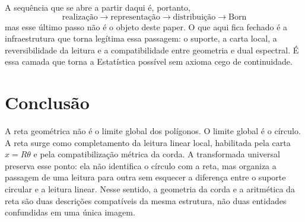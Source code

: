 \documentclass[11pt,a4paper]{article}
\begin{document}
A sequência que se abre a partir daqui é, portanto,
\[
\boxed{
\text{realização}
\longrightarrow
\text{representação}
\longrightarrow
\text{distribuição}
\longrightarrow
\text{Born}
}
\]
mas esse último passo não é o objeto deste paper. O que aqui fica fechado é a infraestrutura que torna legítima essa passagem: o suporte, a carta local, a reversibilidade da leitura e a compatibilidade entre geometria e dual espectral. É essa camada que torna a Estatística possível sem axioma cego de continuidade.

\section{Conclusão}

A reta geométrica não é o limite global dos polígonos. O limite global é o círculo. A reta surge como completamento da leitura linear local, habilitada pela carta $x=R\theta$ e pela compatibilização métrica da corda. A transformada universal preserva esse ponto: ela não identifica o círculo com a reta, mas organiza a passagem de uma leitura para outra sem esquecer a diferença entre o suporte circular e a leitura linear. Nesse sentido, a geometria da corda e a aritmética da reta são duas descrições compatíveis da mesma estrutura, não duas entidades confundidas em uma única imagem.
\end{document}
